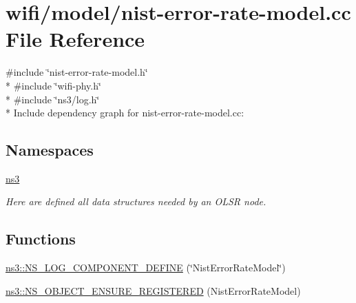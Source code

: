 \hypertarget{nist-error-rate-model_8cc}{}\section{wifi/model/nist-\/error-\/rate-\/model.cc File Reference}
\label{nist-error-rate-model_8cc}
{\ttfamily \#include \char`\"{}nist-\/error-\/rate-\/model.\+h\char`\"{}}\\*
{\ttfamily \#include \char`\"{}wifi-\/phy.\+h\char`\"{}}\\*
{\ttfamily \#include \char`\"{}ns3/log.\+h\char`\"{}}\\*
Include dependency graph for nist-\/error-\/rate-\/model.cc\+:
\subsection*{Namespaces}
\begin{DoxyCompactItemize}
\item 
 \hyperlink{namespacens3}{ns3}
\begin{DoxyCompactList}\small\item\em Here are defined all data structures needed by an O\+L\+SR node. \end{DoxyCompactList}\end{DoxyCompactItemize}
\subsection*{Functions}
\begin{DoxyCompactItemize}
\item 
\hyperlink{namespacens3_a25380e417ddcd96d7c48108ca18deef8}{ns3\+::\+N\+S\+\_\+\+L\+O\+G\+\_\+\+C\+O\+M\+P\+O\+N\+E\+N\+T\+\_\+\+D\+E\+F\+I\+NE} (\char`\"{}Nist\+Error\+Rate\+Model\char`\"{})
\item 
\hyperlink{namespacens3_ad83797bfda7ebbdadd2907116c86f2c4}{ns3\+::\+N\+S\+\_\+\+O\+B\+J\+E\+C\+T\+\_\+\+E\+N\+S\+U\+R\+E\+\_\+\+R\+E\+G\+I\+S\+T\+E\+R\+ED} (Nist\+Error\+Rate\+Model)
\end{DoxyCompactItemize}
